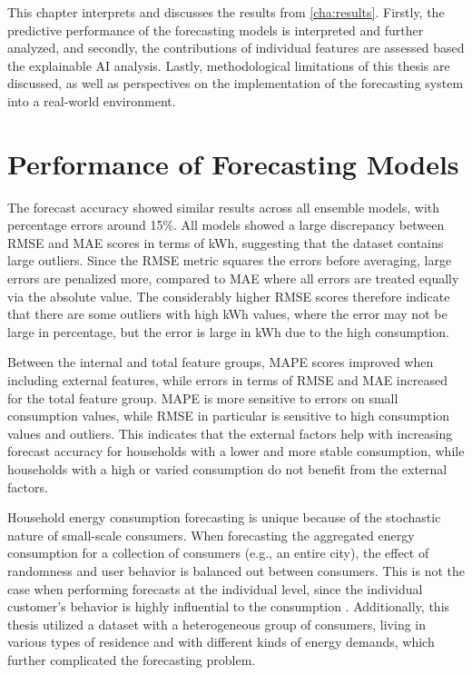 This chapter interprets and discusses the results from \autoref{cha:results}. Firstly, the predictive performance of the forecasting models is interpreted and further analyzed, and secondly, the contributions of individual features are assessed based the explainable AI analysis. Lastly, methodological limitations of this thesis are discussed, as well as perspectives on the implementation of the forecasting system into a real-world environment.

\section{Performance of Forecasting Models}

The forecast accuracy showed similar results across all ensemble models, with percentage errors around 15\%. All models showed a large discrepancy between RMSE and MAE scores in terms of kWh, suggesting that the dataset contains large outliers. Since the RMSE metric squares the errors before averaging, large errors are penalized more, compared to MAE where all errors are treated equally via the absolute value. The considerably higher RMSE scores therefore indicate that there are some outliers with high kWh values, where the error may not be large in percentage, but the error is large in kWh due to the high consumption.

Between the internal and total feature groups, MAPE scores improved when including external features, while errors in terms of RMSE and MAE increased for the total feature group. MAPE is more sensitive to errors on small consumption values, while RMSE in particular is sensitive to high consumption values and outliers. This indicates that the external factors help with increasing forecast accuracy for households with a lower and more stable consumption, while households with a high or varied consumption do not benefit from the external factors.

Household energy consumption forecasting is unique because of the stochastic nature of small-scale consumers. When forecasting the aggregated energy consumption for a collection of consumers (e.g., an entire city), the effect of randomness and user behavior is balanced out between consumers. This is not the case when performing forecasts at the individual level, since the individual customer's behavior is highly influential to the consumption \cite{sun_monthly_2019,lazzari_user_2022}. Additionally, this thesis utilized a dataset with a heterogeneous group of consumers, living in various types of residence and with different kinds of energy demands, which further complicated the forecasting problem.

